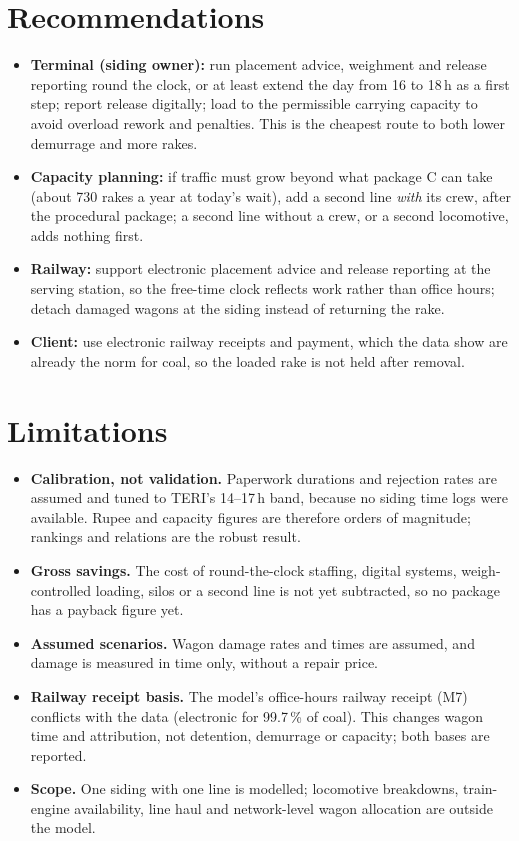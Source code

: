 \section{Recommendations}
\begin{itemize}
    \item \textbf{Terminal (siding owner):} run placement advice, weighment and release reporting round the clock, or at least extend the day from 16 to 18\,h as a first step; report release digitally; load to the permissible carrying capacity to avoid overload rework and penalties. This is the cheapest route to both lower demurrage and more rakes.
    \item \textbf{Capacity planning:} if traffic must grow beyond what package C can take (about 730 rakes a year at today's wait), add a second line \emph{with} its crew, after the procedural package; a second line without a crew, or a second locomotive, adds nothing first.
    \item \textbf{Railway:} support electronic placement advice and release reporting at the serving station, so the free-time clock reflects work rather than office hours; detach damaged wagons at the siding instead of returning the rake.
    \item \textbf{Client:} use electronic railway receipts and payment, which the data show are already the norm for coal, so the loaded rake is not held after removal.
\end{itemize}

\section{Limitations}
\begin{itemize}
    \item \textbf{Calibration, not validation.} Paperwork durations and rejection rates are assumed and tuned to TERI's 14--17\,h band, because no siding time logs were available. Rupee and capacity figures are therefore orders of magnitude; rankings and relations are the robust result.
    \item \textbf{Gross savings.} The cost of round-the-clock staffing, digital systems, weigh-controlled loading, silos or a second line is not yet subtracted, so no package has a payback figure yet.
    \item \textbf{Assumed scenarios.} Wagon damage rates and times are assumed, and damage is measured in time only, without a repair price.
    \item \textbf{Railway receipt basis.} The model's office-hours railway receipt (M7) conflicts with the data (electronic for 99.7\,\% of coal). This changes wagon time and attribution, not detention, demurrage or capacity; both bases are reported.
    \item \textbf{Scope.} One siding with one line is modelled; locomotive breakdowns, train-engine availability, line haul and network-level wagon allocation are outside the model.
\end{itemize}

